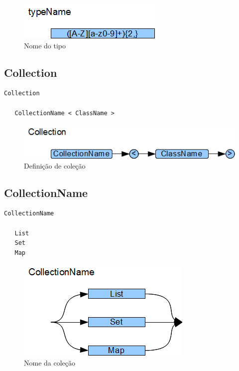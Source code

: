 \begin{figure}[h!]
 \centering
 \includegraphics{capitulo09/typeName.png}
 \caption{Nome do tipo}
\end{figure}
\subsection{Collection}

\begin{lstlisting}
Collection

   CollectionName < ClassName >

\end{lstlisting}

\begin{figure}[h!]
 \centering
 \includegraphics{capitulo09/Collection.png}
 \caption{Definição de coleção}
\end{figure}
\subsection{CollectionName}

\begin{lstlisting}
CollectionName

   List
   Set
   Map

\end{lstlisting}

\begin{figure}[h!]
 \centering
 \includegraphics[scale=0.7]{capitulo09/CollectionName.png}
 \caption{Nome da coleção}
\end{figure}
